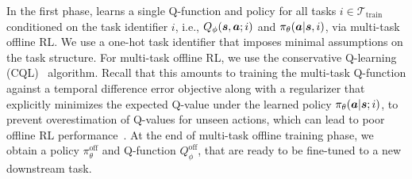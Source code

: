  In the first phase, \ptrmethodname learns a single Q-function and policy for all tasks $i \in \mathcal{T}_\text{train}$ conditioned on the task identifier $i$, i.e., $Q_\phi(\boldsymbol{s}, \boldsymbol{a}; i)$ and $\pi_\theta(\boldsymbol{a}|\boldsymbol{s}, i)$, via multi-task offline RL. We use a one-hot task identifier that imposes minimal assumptions on the task structure. For multi-task offline RL, we use the conservative Q-learning (CQL)~\citep{kumar2020conservative} algorithm. Recall that this amounts to training the multi-task Q-function against a temporal difference error objective along with a regularizer that explicitly minimizes the expected Q-value under the learned policy $\pi_\theta(\boldsymbol{a}|\boldsymbol{s}; i)$,
to prevent overestimation of Q-values for unseen actions, which can lead to poor offline RL performance~\citep{kumar2019stabilizing}. 
At the end of multi-task offline training phase, we obtain a policy $\pi^\text{off}_\theta$ and Q-function $Q^\text{off}_\phi$, that are ready to be fine-tuned to a new downstream task.


